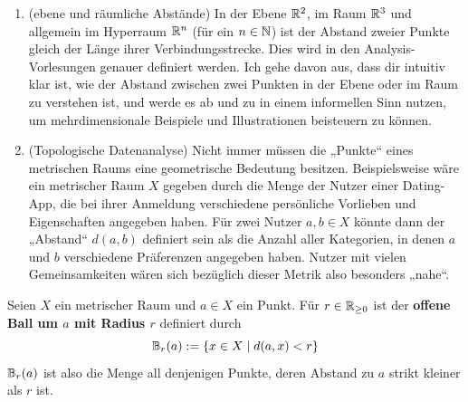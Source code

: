 \begin{bsp} \quad
    \begin{enumerate}
        \item(ebene und räumliche Abstände) In der Ebene $\mathbb R^2$, im Raum $\mathbb R^3$ und allgemein im Hyperraum $\mathbb R^n$ (für ein $n\in \mathbb N$) ist der Abstand zweier Punkte gleich der Länge ihrer Verbindungsstrecke. Dies wird in den Analysis-Vorlesungen genauer definiert werden. %
        Ich gehe davon aus, dass dir intuitiv klar ist, wie der Abstand zwischen zwei Punkten in der Ebene oder im Raum zu verstehen ist, und werde es ab und zu in einem informellen Sinn nutzen, um mehrdimensionale Beispiele und Illustrationen beisteuern zu können.
        \item(Topologische Datenanalyse) Nicht immer müssen die „Punkte“ eines metrischen Raums eine geometrische Bedeutung besitzen. Beispielsweise wäre ein metrischer Raum $X$ gegeben durch die Menge der Nutzer einer Dating-App, die bei ihrer Anmeldung verschiedene persönliche Vorlieben und Eigenschaften angegeben haben. Für zwei Nutzer $a,b\in X$ könnte dann der „Abstand“ $d(a,b)$ definiert sein als die Anzahl aller Kategorien, in denen $a$ und $b$ verschiedene Präferenzen angegeben haben. Nutzer mit vielen Gemeinsamkeiten wären sich bezüglich dieser Metrik also besonders „nahe“.
    \end{enumerate}
\end{bsp}


\begin{defin} \label{def:ball} 
    Seien $X$ ein metrischer Raum und $a\in X$ ein Punkt. Für $r\in \mathbb R_{\ge 0}$ ist der \textbf{offene Ball um $a$ mit Radius $r$} definiert durch
        \[ \mathbb B_r(a) := \{ x\in X \mid d(a,x)< r\} \]
    $\mathbb B_r(a)$ ist also die Menge all denjenigen Punkte, deren Abstand zu $a$ strikt kleiner als $r$ ist.
\end{defin}


